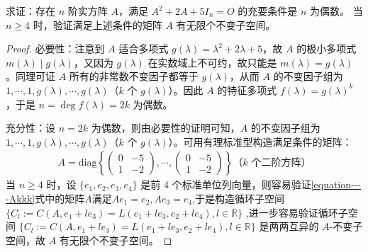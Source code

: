 \documentclass[../../main.tex]{subfiles}%
\begin{document}
\begin{example}
求证：存在 $n$ 阶实方阵 $A$，满足 $A^2 + 2A + 5I_n = O$ 的充要条件是 $n$ 为偶数。
当 $n\geqslant  4$ 时，验证满足上述条件的矩阵 $A$ 有无限个不变子空间。
\end{example}
\begin{proof}

{\heiti 必要性：}注意到 $A$ 适合多项式 $g(\lambda)=\lambda^2 + 2\lambda + 5$，故 $A$ 的极小多项式 $m(\lambda)\mid g(\lambda)$，又因为 $g(\lambda)$ 在实数域上不可约，故只能是 $m(\lambda)=g(\lambda)$。同理可证 $A$ 所有的非常数不变因子都等于 $g(\lambda)$，从而 $A$ 的不变因子组为 $1,\cdots,1,g(\lambda),\cdots,g(\lambda)$（$k$ 个 $g(\lambda)$）。因此 $A$ 的特征多项式 $f(\lambda)=g(\lambda)^k$，于是 $n = \deg f(\lambda)=2k$ 为偶数。

{\heiti 充分性：}设 $n = 2k$ 为偶数，则由必要性的证明可知，$A$ 的不变因子组为 $1,\cdots,1,g(\lambda),\cdots,g(\lambda)$（$k$ 个 $g(\lambda)$）。可用有理标准型构造满足条件的矩阵：
\begin{align}\label{equation----Akkk}
A=\mathrm{diag}\left\{\begin{pmatrix}
0 & -5 \\
1 & -2
\end{pmatrix},\cdots,\begin{pmatrix}
0 & -5 \\
1 & -2
\end{pmatrix}\right\} \text{（$k$ 个二阶方阵）}
\end{align}
当 $n\geqslant  4$ 时，设 $\{e_1,e_2,e_3,e_4\}$ 是前 4 个标准单位列向量，则容易验证\eqref{equation----Akkk}式中的矩阵$A$满足$Ae_1=e_2,Ae_3=e_4$,于是构造循环子空间 $\{C_l := C(A,e_1 + le_3)=L(e_1 + le_3,e_2 + le_4),l\in\mathbb{R}\}$ ,进一步容易验证循环子空间 $\{C_l := C(A,e_1 + le_3)=L(e_1 + le_3,e_2 + le_4),l\in\mathbb{R}\}$ 是两两互异的 $A$-不变子空间，故 $A$ 有无限个不变子空间。

\end{proof}
\end{document}
